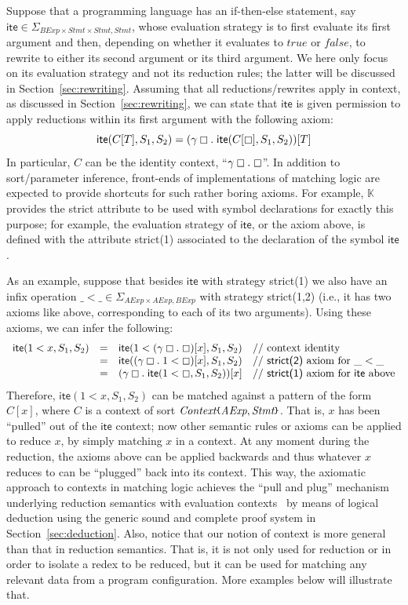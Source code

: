 \documentclass[UTF8,11pt]{article}
\theoremstyle{plain}
\theoremstyle{definition}
\theoremstyle{remark}
\newcommand{\K}{\mbox{$\mathbb{K}$}\xspace}
\newcommand{\Context}{\textit{Context}}
\newcommand{\hole}{\boxempty}
\newcommand{\AExp}{\textit{AExp}}
\newcommand{\BExp}{\textit{BExp}}
\newcommand{\Stmt}{\textit{Stmt}}
\newcommand{\ite}{\textsf{ite}}
\newcommand{\ttrue}{\textit{true}}
\newcommand{\ffalse}{\textit{false}}
\newcommand{\parametric}[2]{{#1}\raisebox{.2ex}{\texttt{\footnotesize{\{}}}#2\raisebox{.2ex}{\texttt{\footnotesize{\}}}}}
\begin{document}
Suppose that a programming language has an if-then-else statement,
say $\ite\in\Sigma_{\BExp\times\Stmt\times\Stmt,\Stmt}$,
whose evaluation strategy is to first evaluate its first argument and then, depending
on whether it evaluates to $\ttrue$ or $\ffalse$, to rewrite to either
its second argument or its third argument.
We here only focus on its evaluation strategy and not its reduction rules;
the latter will be discussed in Section~\ref{sec:rewriting}.
Assuming that all reductions/rewrites apply in context, as discussed in
Section~\ref{sec:rewriting}, we can state that $\ite$ is given permission to
apply reductions within its first argument with the following axiom:
$$
\ite(C[T],S_1,S_2) = (\gamma\hole.\;\ite(C[\hole],S_1,S_2))[T]
$$
In particular, $C$ can be the identity context, ``$\gamma \hole .\; \hole$''.
In addition to sort/parameter inference, front-ends of implementations of
matching logic are expected to provide shortcuts for such rather boring
axioms.
For example, \K provides the \textsf{strict} attribute to be used with symbol
declarations for exactly this purpose; for example, the evaluation strategy
of $\ite$, or the axiom above, is defined with the attribute
\textsf{strict(1)} associated to the declaration of the symbol $\ite$.

As an example, suppose that besides $\ite$ with strategy \textsf{strict(1)}
we also have an infix operation $\_<\_\in\Sigma_{\AExp\times\AExp,\BExp}$ with
strategy \textsf{strict(1,2)}
(i.e., it has two axioms like above, corresponding to each of its two
arguments).
Using these axioms, we can infer the following:
$$
\begin{array}{rcll}
\ite(1 < x,S_1,S_2) & = &
\ite(1 < (\gamma\hole.\;\hole)[x],S_1,S_2)
& \textrm{// context identity}
\\
& = &
\ite((\gamma\hole.\;1 < \hole)[x],S_1,S_2)
& \textrm{// \textsf{strict(2)} axiom for $\_<\_$}
\\
& = &
(\gamma\hole.\;\ite(1 < \hole,S_1,S_2))[x]
& \textrm{// \textsf{strict(1)} axiom for $\ite$ above}
\end{array}
$$
Therefore, $\ite(1 < x,S_1,S_2)$ can be matched against a pattern
of the form $C[x]$, where $C$ is a context of sort
$\parametric{\Context}{\AExp,\Stmt}$.
That is, $x$ has been ``pulled'' out of the $\ite$ context;
now other semantic rules or axioms can be applied to reduce $x$, by
simply matching $x$ in a context.
At any moment during the reduction, the axioms above can be applied
backwards and thus whatever $x$ reduces to can be ``plugged'' back into
its context.
This way, the axiomatic approach to contexts in matching logic
achieves the ``pull and plug'' mechanism underlying reduction
semantics with evaluation contexts~\cite{felleisen-hieb-92} by
means of logical deduction using the generic sound and complete
proof system in Section~\ref{sec:deduction}.
Also, notice that our notion of context is more general than
that in reduction semantics.
That is, it is not only used for reduction or in order to isolate
a redex to be reduced, but it can be used for matching any relevant
data from a program configuration.
More examples below will illustrate that.
\end{document}
